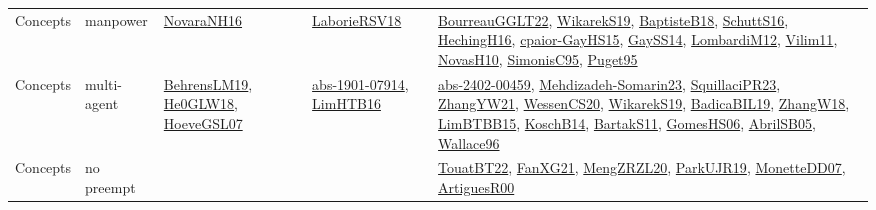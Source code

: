 {\begin{longtable}{lp{3cm}>{\raggedright}p{6cm}>{\raggedright}p{6cm}p{8cm}}
Concepts & manpower & \href{articles/NovaraNH16.pdf}{NovaraNH16}\cite{NovaraNH16} & \href{articles/LaborieRSV18.pdf}{LaborieRSV18}\cite{LaborieRSV18} & \href{articles/BourreauGGLT22.pdf}{BourreauGGLT22}\cite{BourreauGGLT22}, \href{articles/WikarekS19.pdf}{WikarekS19}\cite{WikarekS19}, \href{articles/BaptisteB18.pdf}{BaptisteB18}\cite{BaptisteB18}, \href{papers/SchuttS16.pdf}{SchuttS16}\cite{SchuttS16}, \href{papers/HechingH16.pdf}{HechingH16}\cite{HechingH16}, \href{papers/cpaior-GayHS15.pdf}{cpaior-GayHS15}\cite{cpaior-GayHS15}, \href{papers/GaySS14.pdf}{GaySS14}\cite{GaySS14}, \href{articles/LombardiM12.pdf}{LombardiM12}\cite{LombardiM12}, \href{papers/Vilim11.pdf}{Vilim11}\cite{Vilim11}, \href{articles/NovasH10.pdf}{NovasH10}\cite{NovasH10}, \href{papers/SimonisC95.pdf}{SimonisC95}\cite{SimonisC95}, \href{papers/Puget95.pdf}{Puget95}\cite{Puget95}\\
Concepts & multi-agent & \href{papers/BehrensLM19.pdf}{BehrensLM19}\cite{BehrensLM19}, \href{papers/He0GLW18.pdf}{He0GLW18}\cite{He0GLW18}, \href{papers/HoeveGSL07.pdf}{HoeveGSL07}\cite{HoeveGSL07} & \href{articles/abs-1901-07914.pdf}{abs-1901-07914}\cite{abs-1901-07914}, \href{papers/LimHTB16.pdf}{LimHTB16}\cite{LimHTB16} & \href{articles/abs-2402-00459.pdf}{abs-2402-00459}\cite{abs-2402-00459}, \href{papers/Mehdizadeh-Somarin23.pdf}{Mehdizadeh-Somarin23}\cite{Mehdizadeh-Somarin23}, \href{papers/SquillaciPR23.pdf}{SquillaciPR23}\cite{SquillaciPR23}, \href{articles/ZhangYW21.pdf}{ZhangYW21}\cite{ZhangYW21}, \href{papers/WessenCS20.pdf}{WessenCS20}\cite{WessenCS20}, \href{articles/WikarekS19.pdf}{WikarekS19}\cite{WikarekS19}, \href{papers/BadicaBIL19.pdf}{BadicaBIL19}\cite{BadicaBIL19}, \href{articles/ZhangW18.pdf}{ZhangW18}\cite{ZhangW18}, \href{papers/LimBTBB15.pdf}{LimBTBB15}\cite{LimBTBB15}, \href{papers/KoschB14.pdf}{KoschB14}\cite{KoschB14}, \href{articles/BartakS11.pdf}{BartakS11}\cite{BartakS11}, \href{papers/GomesHS06.pdf}{GomesHS06}\cite{GomesHS06}, \href{papers/AbrilSB05.pdf}{AbrilSB05}\cite{AbrilSB05}, \href{articles/Wallace96.pdf}{Wallace96}\cite{Wallace96}\\
Concepts & no preempt &  &  & \href{papers/TouatBT22.pdf}{TouatBT22}\cite{TouatBT22}, \href{articles/FanXG21.pdf}{FanXG21}\cite{FanXG21}, \href{articles/MengZRZL20.pdf}{MengZRZL20}\cite{MengZRZL20}, \href{papers/ParkUJR19.pdf}{ParkUJR19}\cite{ParkUJR19}, \href{papers/MonetteDD07.pdf}{MonetteDD07}\cite{MonetteDD07}, \href{articles/ArtiguesR00.pdf}{ArtiguesR00}\cite{ArtiguesR00}\\

\end{longtable}}
